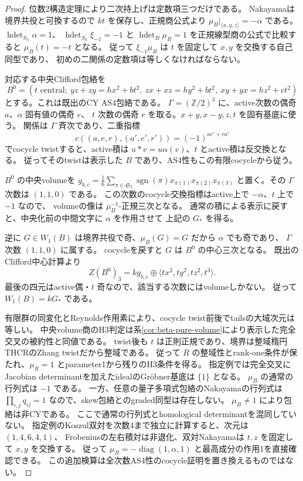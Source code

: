\begin{proof}
位数2構造定理により二次持上げは定数項三つだけである。
Nakayamaは境界共役と可換するので $kt$ を保存し、正規商公式より
$\mu_B|_{\langle x,y,z\rangle}=-\alpha$ である。
$\operatorname{hdet}_{S_h}\alpha=1$、
$\operatorname{hdet}_{S_h}\xi_{-1}=-1$ と
$\operatorname{hdet}_B\mu_B=1$ を正規線型商の公式で比較すると $\mu_B(t)=-t$ となる。
従って $\xi_{-1}\mu_B$ は $t$ を固定して $x,y$ を交換する自己同型であり、
初めの二関係の定数項は等しくなければならない。

対応する中央Clifford包絡を
\[
 B^0=(t\text{ central};\ yz+zy=hx^2+bt^2,\ zx+xz=hy^2+bt^2,\ xy+yx=hz^2+ct^2)
\]
とする。これは既出のCY AS4包絡である。
$\Gamma=(\mathbb Z/2)^3$ に、active次数の偶奇 $a$、$\alpha$ 固有値の偶奇 $e$、
$t$ 次数の偶奇 $r$ を取る。$x+y,x-y,z,t$ を固有基底に使う。
関係は $\Gamma$ 斉次であり、二重指標
\[
 c((a,e,r),(a',e',r'))=(-1)^{ae'+ra'}
\]
でcocycle twistすると、active積は $u*v=u\alpha(v)$、$t$ とactive積は反交換となる。
従ってそのtwistは表示した $B$ であり、AS4性もこの有限cocycleから従う。

$B^0$ の中央volumeを
$g_{b,c}=\frac16\sum_{\pi\in\mathfrak S_3}\operatorname{sgn}(\pi)x_{\pi(1)}x_{\pi(2)}x_{\pi(3)}$
と置く。その $\Gamma$ 次数は $(1,1,0)$ である。
この次数のcocycle交換指標はactive上で $-\alpha$、$t$ 上で $-1$ なので、
volumeの像は $\mu_B^{-1}$-正規三次となる。
通常の積による表示に戻すと、中央化前の中間文字に $\alpha$ を作用させて
上記の $G_*$ を得る。

逆に $G\in W_1(B)$ は境界共役で奇、$\mu_B(G)=G$ だから $\alpha$ でも奇であり、
$\Gamma$ 次数 $(1,1,0)$ に属する。
cocycleを戻すと $G$ は $B^0$ の中心三次となる。
既出のClifford中心計算より
\[
 Z(B^0)_3=kg_{b,c}\oplus\langle tx^2,ty^2,tz^2,t^3\rangle.
\]
最後の四元はactive偶・$t$ 奇なので、該当する次数にはvolumeしかない。
従って $W_1(B)=kG_*$ である。

有限群の同変化とReynolds作用素により、cocycle twist前後でtailsの大域次元は等しい。
中央volume商のH3判定は系\ref{cor:beta-pure-volume}により表示した完全交叉の被約性と同値である。
twist後も $t$ は正則正規であり、境界は整域楕円THCRのZhang twistだから整域である。
従って $R$ の整域性とrank-one条件が保たれ、$\mu_R=1$ とparameter1から残りのH3条件を得る。
指定例では完全交叉にJacobian determinantを加えたidealのGr\"obner基底は $\{1\}$ となる。
$\mu_B$ の通常の行列式は $-1$ である。
一方、任意の量子多項式包絡のNakayamaの行列式は
$\prod_{i,j}q_{ij}=1$ なので、skew包絡とのgraded同型は存在しない。
$\mu_B\ne1$ により包絡は非CYである。
ここで通常の行列式とhomological determinantを混同していない。
指定例のKoszul双対を次数4まで独立に計算すると、次元は $(1,4,6,4,1)$、
Frobeniusの左右積対は非退化、双対Nakayamaは $t,z$ を固定して $x,y$ を交換する。
従って $\mu_B=-\operatorname{diag}(1,\alpha,1)$ と最高成分の作用1を直接確認できる。
この追加検算は全次数AS4性のcocycle証明を置き換えるものではない。
\end{proof}

